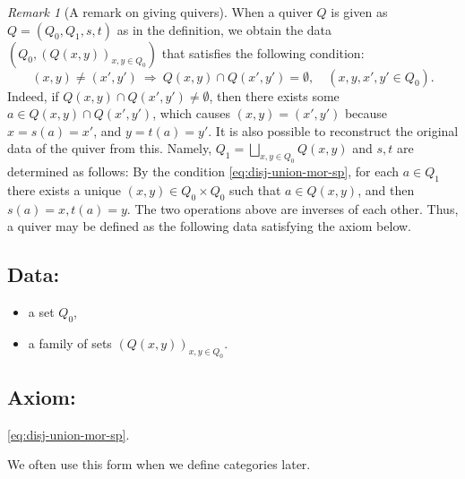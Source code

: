 \documentclass{surv-l}
\numberwithin{equation}{chapter}
\numberwithin{figure}{chapter}
\theoremstyle{plain}
\theoremstyle{definition}
\theoremstyle{remark}
\newtheorem{rmk}[thm]{Remark}
\begin{document}
\begin{rmk}[A remark on giving quivers]\label{rmk:disj-union-mor-sp}
When a quiver $Q$ is given as $Q = (Q_0, Q_1, s,t)$ as in the definition,
we obtain the data $(Q_0, (Q(x,y))_{x,y\in Q_0})$ that satisfies the following condition:
\begin{equation}\label{eq:disj-union-mor-sp}
(x,y) \ne (x',y')\ \text{$\Rightarrow$}\  Q(x,y)\cap Q(x',y') = \emptyset,\quad (x,y,x',y' \in Q_0).
\end{equation}
Indeed, if $Q(x,y)\cap Q(x',y') \ne \emptyset$, then
there exists some $a \in Q(x,y)\cap Q(x',y')$, which causes
$(x,y) = (x',y')$ because $x=s(a) =x'$, and $y =t(a)=y'$.
It is also possible to reconstruct the original data of the quiver from this.
Namely, $Q_1 = \bigsqcup_{x,y\in Q_0}Q(x,y)$ and $s, t$ are determined as follows:
By the condition \eqref{eq:disj-union-mor-sp}, for each $a \in Q_1$ there exists a
unique $(x,y) \in Q_0\times  Q_0$ such that $a \in Q(x,y)$, and then
$s(a) = x, t(a)=y$.
The two operations above are inverses of each other.
Thus, a quiver may be defined as the following data satisfying the axiom below.

\subsection*{Data:}
\begin{itemize}
    \item a set $Q_0$,
    \item a family of sets $(Q(x,y))_{x,y\in Q_0}$.
\end{itemize}

\subsection*{Axiom:} \eqref{eq:disj-union-mor-sp}.

We often use this form when we define categories later.
\end{rmk}
\end{document}
